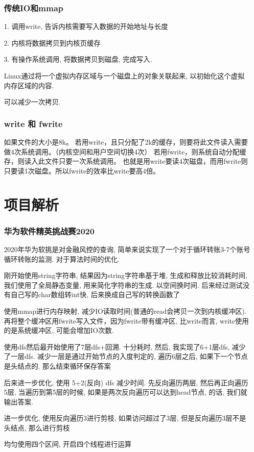 \documentclass[UTF8]{ctexart}
\begin{document}
\subsubsection{传统IO和mmap}
1. 调用write, 告诉内核需要写入数据的开始地址与长度 \par
2. 内核将数据拷贝到内核页缓存 \par
3. 有操作系统调用, 将数据拷贝到磁盘, 完成写入. \par
Linux通过将一个虚拟内存区域与一个磁盘上的对象关联起来, 以初始化这个虚拟内存区域的内容. \par
可以减少一次拷贝. 

\subsubsection{write 和 fwrite}
如果文件的大小是8k。
若用write，且只分配了2k的缓存，则要将此文件读入需要做4次系统调用。（内核空间和用户空间切换4次）
若用fwrite，则系统自动分配缓存，则读入此文件只要一次系统调用。
也就是用write要读4次磁盘，而用fwrite则只要读1次磁盘。所以fwrite的效率比write要高4倍。

\section{项目解析}
\subsubsection{华为软件精英挑战赛2020}
2020年华为软挑是对金融风控的查询, 简单来说实现了一个对于循环转账3-7个账号循环转账的监测. 对于算法时间的优化. \par
刚开始使用string字符串, 结果因为string字符串基于堆, 生成和释放比较消耗时间, 我们使用了全局静态变量, 用来简化字符串的生成. 以空间换时间. 后来经过测试没有自己写的char数组转int快, 后来换成自己写的转换函数了 \par
使用mmap进行内存映射, 减少IO读取时间(普通的read会拷贝一次到内核缓冲区). 再将整个缓冲区用fwrite写入文件，因为fwrite带有缓冲区, 比write而言, write使用的是系统缓冲区, 可能会增加IO次数.\par
使用dfs然后最开始使用了7层dfs+回溯. 十分耗时, 然后, 我实现了6+1层dfs, 减少了一层dfs. 减少一层是通过开始节点的入度判定的, 遍历6层之后, 如果下一个节点是头结点的. 那么结束循环保存答案\par
后来进一步优化, 使用 5+2(反向) dfs 减少时间. 先反向遍历两层, 然后再正向遍历5层, 当遍历到第5层的时候, 如果是两次反向遍历可以达到head节点, 的话, 我们就输出答案. \par
进一步优化, 使用反向遍历3进行剪枝, 如果访问超过了3层, 但是反向遍历3层不是头结点, 那么进行剪枝 \par
均匀使用四个区间, 开启四个线程进行运算 \par
\end{document}
